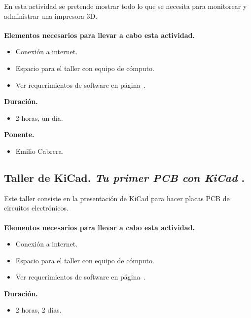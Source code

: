 \documentclass[a4paper,11pt]{article}                 %
\begin{document}
   En esta actividad se pretende mostrar todo lo que se necesita para monitorear y administrar una impresora 3D.
      \paragraph{}
  \textbf{Elementos necesarios para llevar a cabo esta actividad.}
  \begin{itemize}
    \label{list:impresion}
    \item Conexión a internet.
    \item Espacio para el taller con equipo de cómputo.
    \item Ver requerimientos de software en página~\pageref{list:impresions}.
  \end{itemize}
  
  \textbf{Duración.}
  \begin{itemize}
    \item 2 horas, un día.
  \end{itemize}
  
              \textbf{Ponente.}
  \begin{itemize}
    \item Emilio Cabrera.
  \end{itemize}
  
  
              \subsection{Taller de KiCad.  \textit{Tu primer PCB con KiCad} .}                                     %

   Este taller consiste en la presentación de KiCad para hacer placas PCB de circuitos electrónicos.
      \paragraph{}
  \textbf{Elementos necesarios para llevar a cabo esta actividad.}
  \begin{itemize}
  \label{list:kicad}
    \item Conexión a internet.
    \item Espacio para el taller con equipo de cómputo.
    \item Ver requerimientos de software en página~\pageref{list:kicads}.
  \end{itemize}
  
  \textbf{Duración.}
  \begin{itemize}
    \item 2 horas, 2 días.
  \end{itemize}
  
\end{document}
